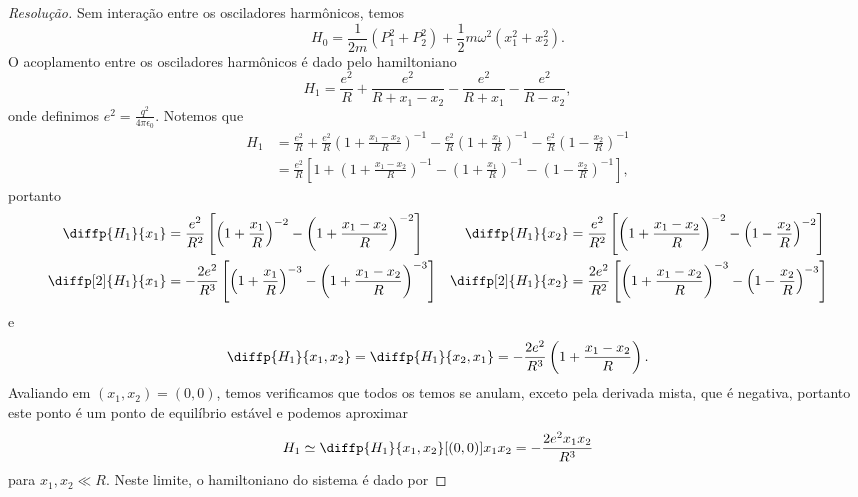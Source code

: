 \begin{proof}[Resolução]
    Sem interação entre os osciladores harmônicos, temos
    \begin{equation*}
        H_0 = \frac{1}{2m}(P_1^2 + P_2^2) + \frac{1}{2}m \omega^2 (x_1^2 + x_2^2).
    \end{equation*}
    O acoplamento entre os osciladores harmônicos é dado pelo hamiltoniano
    \begin{equation*}
        H_1 = \frac{e^2}{R} + \frac{e^2}{R + x_1 - x_2} - \frac{e^2}{R+x_1} - \frac{e^2}{R - x_2},
    \end{equation*}
    onde definimos \(e^2 = \frac{q^2}{4\pi \epsilon_0}\). Notemos que
    \begin{align*}
        H_1 &= \frac{e^2}{R} + \frac{e^2}{R}\left(1 + \frac{x_1 - x_2}{R}\right)^{-1} - \frac{e^2}{R} \left(1 + \frac{x_1}{R}\right)^{-1} - \frac{e^2}{R}\left(1 - \frac{x_2}{R}\right)^{-1} \\
            &= \frac{e^2}{R}\left[1 + \left(1 + \frac{x_1 - x_2}{R}\right)^{-1} - \left(1 + \frac{x_1}{R}\right)^{-1} - \left(1 - \frac{x_2}{R}\right)^{-1}\right],
    \end{align*}
    portanto
    \begin{align*}
        \diffp{H_1}{x_1} &= \frac{e^2}{R^2}\left[\left(1 + \frac{x_1}{R}\right)^{-2} - \left(1 + \frac{x_1 - x_2}{R}\right)^{-2}\right]&
        \diffp{H_1}{x_2} &= \frac{e^2}{R^2}\left[\left(1 + \frac{x_1 - x_2}{R}\right)^{-2} - \left(1 - \frac{x_2}{R}\right)^{-2}\right]\\
        \diffp[2]{H_1}{x_1} &= -\frac{2e^2}{R^3}\left[\left(1 + \frac{x_1}{R}\right)^{-3} - \left(1 + \frac{x_1 - x_2}{R}\right)^{-3}\right]&
        \diffp[2]{H_1}{x_2} &= \frac{2e^2}{R^2}\left[\left(1 + \frac{x_1 - x_2}{R}\right)^{-3} - \left(1 - \frac{x_2}{R}\right)^{-3}\right]
    \end{align*}
    e
    \begin{equation*}
        \diffp{H_1}{x_1,x_2} = \diffp{H_1}{x_2,x_1} = -\frac{2e^2}{R^3}\left(1 + \frac{x_1 - x_2}{R}\right).
    \end{equation*}
    Avaliando em \((x_1,x_2) = (0,0)\), temos verificamos que todos os temos se anulam, exceto pela derivada mista, que é negativa, portanto este ponto é um ponto de equilíbrio estável e podemos aproximar
    \begin{equation*}
        H_1 \simeq \diffp{H_1}{x_1,x_2}[(0,0)]x_1x_2 = -\frac{2e^2x_1x_2}{R^3}
    \end{equation*}
    para \(x_1,x_2 \ll R\). Neste limite, o hamiltoniano do sistema é dado por

\end{proof}
